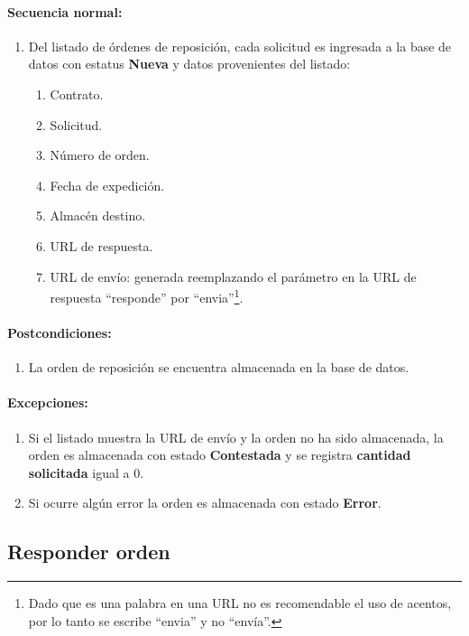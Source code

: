 \paragraph{Secuencia normal:}
\begin{enumerate}
  \item Del listado de órdenes de reposición, cada solicitud es ingresada a la base de datos con estatus \textbf{Nueva} y datos provenientes del listado:
  \begin{enumerate}
    \item Contrato.
    \item Solicitud.
    \item Número de orden.
    \item Fecha de expedición.
    \item Almacén destino.
    \item URL de respuesta.
    \item URL de envío: generada reemplazando el parámetro en la URL de respuesta ``responde'' por ``envia''\footnote{Dado que es una palabra en una URL no es recomendable el uso de acentos, por lo tanto se escribe ``envia'' y no ``envía''.}.
  \end{enumerate}
\end{enumerate}
\paragraph{Postcondiciones:}
\begin{enumerate}
  \item La orden de reposición se encuentra almacenada en la base de datos.
\end{enumerate}
\paragraph{Excepciones:}
\begin{enumerate}
  \item Si el listado muestra la URL de envío y la orden no ha sido almacenada, la orden es almacenada con estado \textbf{Contestada} y se registra \textbf{cantidad solicitada} igual a 0.
  \item Si ocurre algún error la orden es almacenada con estado \textbf{Error}.
\end{enumerate}


\subsection{Responder orden}\label{cu-responder-orden}
